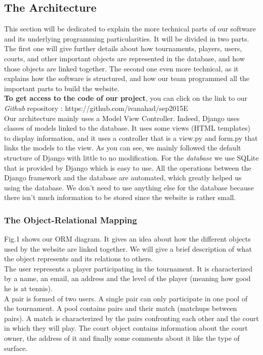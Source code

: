 \documentclass[a4paper, 12pt]{article}
\begin{document}
\subsection{The Architecture}
This section will be dedicated to explain the more technical parts of our software and its underlying programming particularities. It will be divided in two parts. The first one will give further details about how tournaments, players, users, courts, and other important objects are represented in the database, and how those objects are linked together. The second one even more technical, as it explains how the software is structured, and how our team programmed all the important parts to build the website.\\


\textbf{To get access to the code of our project}, you can click on the link to our \textit{Github} repository : https://github.com/ivanahad/sep2015E\\

Our architecture mainly uses a Model View Controller. Indeed, Django uses classes of models linked to the database. It uses some views (HTML templates) to display information, and it uses a controller that is a view.py and form.py that links the models to the view. As you can see, we mainly followed the default structure of Django with little to no modification. For the \textit{database} we use SQLite that is provided by Django which is easy to use. All the operations between the Django framework and the database are automated, which greatly helped us using the database. We don't need to use anything else for the database because there isn't much information to be stored since the website is rather small. 

\newpage
\subsubsection{The Object-Relational Mapping}
Fig.1 shows our ORM diagram. It gives an idea about how the different objects used by the website are linked together. We will give a brief description of what the object represents and its relations to others.\\

The user represents a player participating in the tournament. It is characterized by a name, an email, an address and the level of the player (meaning how good he is at tennis).\\

A pair is formed of two users. A single pair can only participate in one pool of the tournament. A pool contains pairs and their match (matchups between pairs). A match is characterized by the pairs confronting each other and the court in which they will play. The court object contains information about the court owner, the address of it and finally some comments about it like the type of surface.\\
\end{document}
